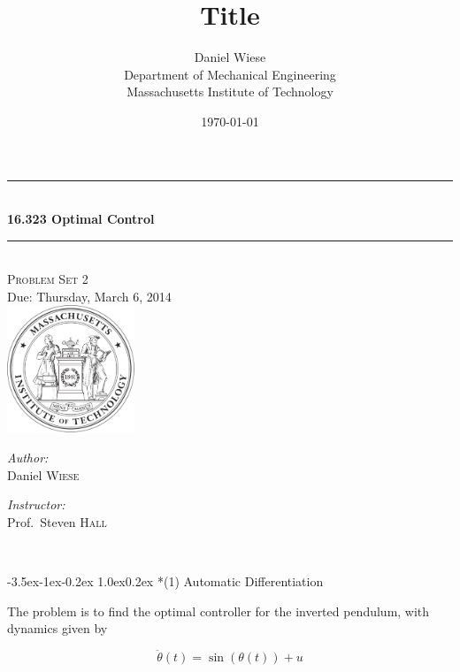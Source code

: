 \documentclass[11pt,letterpaper,onecolumn,notitlepage]{article}
\title{\textbf{Title}}
\author{Daniel Wiese \\ Department of Mechanical Engineering \\ Massachusetts Institute of Technology}
\date{\today}
\makeatletter
\renewcommand\section{\@startsection{section}{1}{\z@}%
{-3.5ex\@plus-1ex\@minus-0.2ex}%
{1.0ex\@plus0.2ex}%
{\fontsize{12pt}{12pt}\selectfont\bfseries\sffamily}}
\makeatother
\begin{document}
\begin{titlepage}
  \begin{center}
    \rule{\linewidth}{0.01in} \\[0.25in]
    {\huge\bfseries 16.323 Optimal Control}\\[0.4cm]
    \rule{\linewidth}{0.01in} \\[0.25in]

    \textsc{\LARGE Problem Set 2}\\[0.15in]
    \large Due: Thursday, March 6, 2014 \\[1.0in]
    \includegraphics[width=1.5in]{../fig/mit-seal.pdf}\\[3.0in]

    \begin{minipage}{0.4\textwidth}
      \begin{flushleft} \large
        \emph{Author:}\\
        Daniel \textsc{Wiese}
        \vfill
      \end{flushleft}
    \end{minipage}
    \begin{minipage}{0.4\textwidth}
      \begin{flushright} \large
        \emph{Instructor:} \\
        Prof.~Steven \textsc{Hall} \\
      \end{flushright}
    \end{minipage} \\
    \vfill
  \end{center}
\end{titlepage}

\clearpage
\section*{(1) Automatic Differentiation}

The problem is to find the optimal controller for the inverted pendulum, with dynamics given by

\begin{equation*}
  \ddot{\theta}(t)=\sin(\theta(t))+u
\end{equation*}
\end{document}
